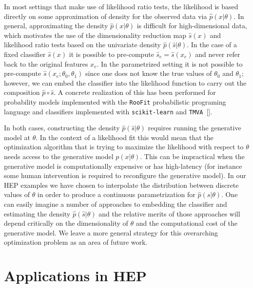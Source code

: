 \documentclass[aoas,preprint]{imsart}
\newcommand{\citek}[1]{[\cite{#1}]}
\numberwithin{equation}{section}
\theoremstyle{plain}
\begin{document}
In most settings that make use of likelihood ratio tests, the likelihood is based directly on some approximation of density for the observed data via $\hat{p}(x|\theta)$.  In general, approximating the density $\hat{p}(x|\theta)$ is difficult for high-dimensional data, which motivates the use of the dimensionality reduction map $\hat{s}(x)$ and likelihood ratio tests based on the univariate density $\hat{p}(\hat{s}|\theta)$.  In the case of a fixed classifier $\hat s(x)$ it is possible to pre-compute $\hat s_e=\hat s(x_e)$ and never refer back to the original features $x_e$. In the parametrized setting it is not possible to pre-compute $\hat s(x_e; \theta_0, \theta_1)$ since one does not know the true values of  $\theta_0$ and $\theta_1$; however, we can  embed the classifier into the likelihood function to carry out the composition $\hat{p}\circ \hat{s}$. A concrete realization of this has been performed for probability models implemented with the \texttt{RooFit} probabilistic programing language and  classifiers implemented with \texttt{scikit-learn} and \texttt{TMVA}~\citek{Verkerke:2003ir,scikit-learn,Hocker:2007ht}.

In both cases, constructing the density $\hat p(\hat s|\theta)$ requires running the generative model at $\theta$. In the context of a likelihood fit this would mean that the optimization algorithm that is trying to maximize the likelihood with respect to $\theta$ needs access to the generative model $p(x|\theta)$. This can be  impractical when the generative model is computationally expensive or has high-latency (for instance some human intervention is required to reconfigure the generative model).  In our HEP examples we have chosen to interpolate the distribution between discrete values of $\theta$ in order to produce a continuous parametrization for $\hat p(\hat s | \theta)$. 
One can easily imagine a number of approaches to embedding the classifier and estimating the density $\hat p(\hat s|\theta)$ and the relative merits of those approaches will depend critically on the dimensionality of $\theta$ and the computational cost of the generative model. We leave a more general strategy for this overarching optimization problem as an area of future work.

\section{Applications in HEP}
\end{document}
